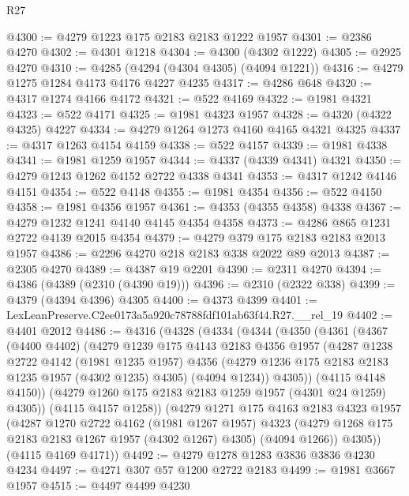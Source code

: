 \begin{lexlean}{R27}
\begin{coremodule}
@4300 := @4279 @1223 @175 @2183 @2183 @1222 @1957
@4301 := @2386 @4270
@4302 := @4301 @1218
@4304 := @4300 (@4302 @1222)
@4305 := @2925 @4270
@4310 := @4285 (@4294 (@4304 @4305) (@4094 @1221))
@4316 := @4279 @1275 @1284 @4173 @4176 @4227 @4235
@4317 := @4286 @648
@4320 := @4317 @1274 @4166 @4172
@4321 := @522 @4169
@4322 := @1981 @4321
@4323 := @522 @4171
@4325 := @1981 @4323 @1957
@4328 := @4320 (@4322 @4325) @4227
@4334 := @4279 @1264 @1273 @4160 @4165 @4321 @4325
@4337 := @4317 @1263 @4154 @4159
@4338 := @522 @4157
@4339 := @1981 @4338
@4341 := @1981 @1259 @1957
@4344 := @4337 (@4339 @4341) @4321
@4350 := @4279 @1243 @1262 @4152 @2722 @4338 @4341
@4353 := @4317 @1242 @4146 @4151
@4354 := @522 @4148
@4355 := @1981 @4354
@4356 := @522 @4150
@4358 := @1981 @4356 @1957
@4361 := @4353 (@4355 @4358) @4338
@4367 := @4279 @1232 @1241 @4140 @4145 @4354 @4358
@4373 := @4286 @865 @1231 @2722 @4139 @2015 @4354
@4379 := @4279 @379 @175 @2183 @2183 @2013 @1957
@4386 := @2296 @4270 @218 @2183 @338 @2022 @89 @2013
@4387 := @2305 @4270
@4389 := @4387 @19 @2201
@4390 := @2311 @4270
@4394 := @4386 (@4389 (@2310 (@4390 @19)))
@4396 := @2310 (@2322 @338)
@4399 := @4379 (@4394 @4396) @4305
@4400 := @4373 @4399
@4401 := LexLeanPreserve.C2ee0173a5a920c78788fdf101ab63f44.R27.__rel_19
@4402 := @4401 @2012
@4486 := @4316
    (@4328
      (@4334
        (@4344
          (@4350
            (@4361
              (@4367
                (@4400 @4402)
                (@4279
                  @1239
                  @175
                  @4143
                  @2183
                  @4356
                  @1957
                  (@4287
                    @1238
                    @2722
                    @4142
                    (@1981 @1235 @1957)
                    @4356
                    (@4279 @1236 @175 @2183 @2183 @1235 @1957 (@4302 @1235) @4305)
                    (@4094 @1234))
                  @4305))
              (@4115 @4148 @4150))
            (@4279 @1260 @175 @2183 @2183 @1259 @1957 (@4301 @24 @1259) @4305))
          (@4115 @4157 @1258))
        (@4279
          @1271
          @175
          @4163
          @2183
          @4323
          @1957
          (@4287
            @1270
            @2722
            @4162
            (@1981 @1267 @1957)
            @4323
            (@4279 @1268 @175 @2183 @2183 @1267 @1957 (@4302 @1267) @4305)
            (@4094 @1266))
          @4305))
      (@4115 @4169 @4171))
@4492 := @4279 @1278 @1283 @3836 @3836 @4230 @4234
@4497 := @4271 @307 @57 @1200 @2722 @2183
@4499 := @1981 @3667 @1957
@4515 := @4497
    @4499
    @4230

\end{coremodule}
\end{lexlean}
